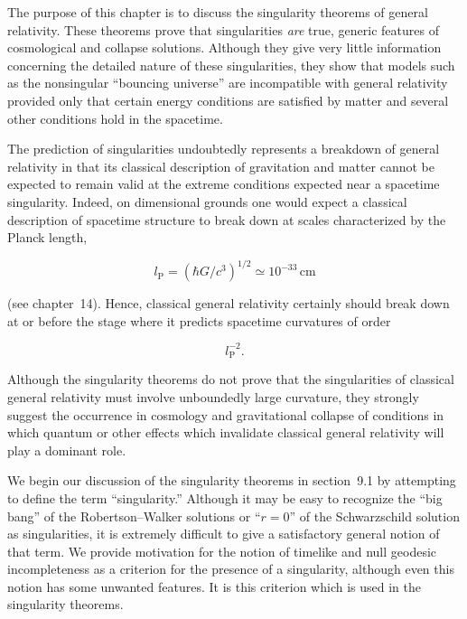 The purpose of this chapter is to discuss the singularity theorems of general
relativity. These theorems prove that singularities \emph{are} true, generic features of
cosmological and collapse solutions. Although they give very little information
concerning the detailed nature of these singularities, they show that models such as
the nonsingular ``bouncing universe'' are incompatible with general relativity
provided only that certain energy conditions are satisfied by matter and several other
conditions hold in the spacetime.

The prediction of singularities undoubtedly represents a breakdown of general
relativity in that its classical description of gravitation and matter cannot be expected
to remain valid at the extreme conditions expected near a spacetime singularity.
Indeed, on dimensional grounds one would expect a classical description of spacetime
structure to break down at scales characterized by the Planck length,

\[
  l_{\mathrm P}=(\hbar G/c^3)^{1/2}\simeq10^{-33}\,\mathrm{cm}
\]

(see chapter~14). Hence, classical general relativity certainly should break down at
or before the stage where it predicts spacetime curvatures of order

\[
  l_{\mathrm P}^{-2}.
\]

Although the singularity theorems do not prove that the singularities of classical
general relativity must involve unboundedly large curvature, they strongly suggest
the occurrence in cosmology and gravitational collapse of conditions in which
quantum or other effects which invalidate classical general relativity will play a
dominant role.

We begin our discussion of the singularity theorems in section~9.1 by attempting
to define the term ``singularity.'' Although it may be easy to recognize the ``big bang''
of the Robertson--Walker solutions or ``\(r=0\)'' of the Schwarzschild solution as
singularities, it is extremely difficult to give a satisfactory general notion of that
term. We provide motivation for the notion of timelike and null geodesic
incompleteness as a criterion for the presence of a singularity, although even this notion
has some unwanted features. It is this criterion which is used in the singularity
theorems.

